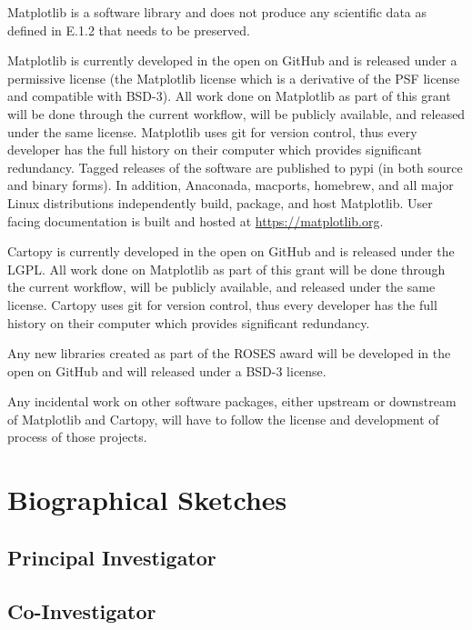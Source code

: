\documentclass[12pt]{article}
\numberwithin{page}{section}
\begin{document}
Matplotlib is a software library and does not produce any scientific
data as defined in E.1.2 that needs to be preserved.

Matplotlib is currently developed in the open on GitHub and is
released under a permissive license (the Matplotlib license which is a
derivative of the PSF license and compatible with BSD-3).  All work
done on Matplotlib as part of this grant will be done through the
current workflow, will be publicly available, and released under the
same license.  Matplotlib uses git for version control, thus every
developer has the full history on their computer which provides
significant redundancy.  Tagged releases of the software are published
to pypi (in both source and binary forms).  In addition, Anaconada,
macports, homebrew, and all major Linux distributions independently
build, package, and host Matplotlib.  User facing documentation is built
and hosted at \url{https://matplotlib.org}.

Cartopy is currently developed in the open on GitHub and is released
under the LGPL.  All work done on Matplotlib as part of this grant
will be done through the current workflow, will be publicly available,
and released under the same license. Cartopy uses git for version
control, thus every developer has the full history on their computer
which provides significant redundancy.


Any new libraries created as part of the ROSES award will be developed
in the open on GitHub and will released under a BSD-3 license.

Any incidental work on other software packages, either upstream or
downstream of Matplotlib and Cartopy, will have to follow the license
and development of process of those projects.


\newpage
\section{Biographical Sketches}
\setcounter{page}{1}
\subsection{Principal Investigator}
\newpage
\subsection{Co-Investigator}

\newpage
\end{document}
